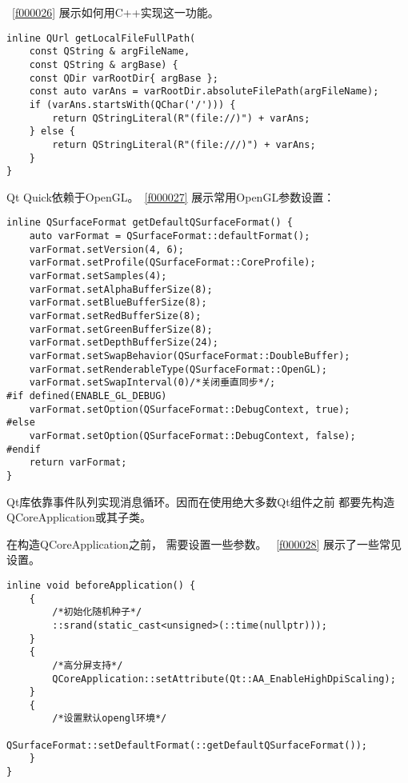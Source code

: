\lstlistingname\ \ref{f000026}
展示如何用C{\sourcefonttwo{}+}{\sourcefonttwo{}+}实现这一功能。

\FloatBarrier
\begin{lstlisting}[label=f000026,
caption=GoodLuck,
title=\lstlistingname\ \thelstlisting
,firstnumber=6]
inline QUrl getLocalFileFullPath(
    const QString & argFileName,
    const QString & argBase) {
    const QDir varRootDir{ argBase };
    const auto varAns = varRootDir.absoluteFilePath(argFileName);
    if (varAns.startsWith(QChar('/'))) {
        return QStringLiteral(R"(file://)") + varAns;
    } else {
        return QStringLiteral(R"(file:///)") + varAns;
    }
}
\end{lstlisting}          %

Qt Quick依赖于OpenGL。\lstlistingname\ \ref{f000027}
展示常用OpenGL参数设置：

\FloatBarrier
\begin{lstlisting}[label=f000027,
caption=GoodLuck,
title=\lstlistingname\ \thelstlisting
,firstnumber=18]
inline QSurfaceFormat getDefaultQSurfaceFormat() {
    auto varFormat = QSurfaceFormat::defaultFormat();
    varFormat.setVersion(4, 6);
    varFormat.setProfile(QSurfaceFormat::CoreProfile);
    varFormat.setSamples(4);
    varFormat.setAlphaBufferSize(8);
    varFormat.setBlueBufferSize(8);
    varFormat.setRedBufferSize(8);
    varFormat.setGreenBufferSize(8);
    varFormat.setDepthBufferSize(24);
    varFormat.setSwapBehavior(QSurfaceFormat::DoubleBuffer);
    varFormat.setRenderableType(QSurfaceFormat::OpenGL);
    varFormat.setSwapInterval(0)/*关闭垂直同步*/;
#if defined(ENABLE_GL_DEBUG)
    varFormat.setOption(QSurfaceFormat::DebugContext, true);
#else
    varFormat.setOption(QSurfaceFormat::DebugContext, false);
#endif
    return varFormat;
}
\end{lstlisting}          %

Qt库依靠事件队列实现消息循环。因而在使用绝大多数Qt组件之前
都要先构造QCoreApplication或其子类。

在构造QCoreApplication之前，
需要设置一些参数。
\lstlistingname\ \ref{f000028}
展示了一些常见设置。

\FloatBarrier
\begin{lstlisting}[label=f000028,
caption=GoodLuck,
title=\lstlistingname\ \thelstlisting
,firstnumber=39]
inline void beforeApplication() {
    {
        /*初始化随机种子*/
        ::srand(static_cast<unsigned>(::time(nullptr)));
    }
    {
        /*高分屏支持*/
        QCoreApplication::setAttribute(Qt::AA_EnableHighDpiScaling);
    }
    {
        /*设置默认opengl环境*/
        QSurfaceFormat::setDefaultFormat(::getDefaultQSurfaceFormat());
    }
}
\end{lstlisting}          %

